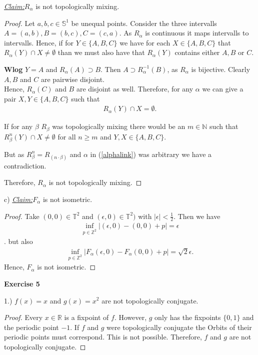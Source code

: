 \documentclass{article}
\newcommand{\claim}{\underline{\textit{Claim:}}\hspace{0,2cm}}
\newcommand{\N}{\mathbb{N}}
\newcommand{\Z}{\mathbb{Z}}
\renewcommand{\S}[1]{\mathbb{S}^{#1}}
\newcommand{\T}[1]{\mathbb{T}^{#1}}
\newcommand{\R}{\mathbb{R}}
\theoremstyle{definition}
\theoremstyle{plain}
\theoremstyle{remark}
\newcommand{\aufgabe}[1]{
	{
		\vspace*{0.5cm}
		\textsf{\textbf{Exercise #1}}
		\vspace*{0.2cm}

	}
}
\newcommand{\teilaufgabe}[1]{
	{
\noindent 
\vspace*{0.2cm}
\hspace*{0,1 cm}
\textsf{#1)}
}
}
\begin{document}
\claim $R_{\alpha}$ is not topologically mixing.
\begin{proof}
	Let $a,b,c \in \S1$ be unequal points.
	Consider the three intervalls $A = (a,b), B=(b,c), C=(c,a)$. As $R_{\alpha}$ is continuous it maps intervalls to intervalls. Hence, if for $Y\in\{A,B,C\}$ we have for each $X\in\{A,B,C\}$ that $R_{\alpha}(Y)\cap X\neq \emptyset$ than we must also have that $R_{\alpha}(Y)$ contains either $A, B$ or $C$.

	\textbf{Wlog} $Y=A$ and $R_{\alpha}(A) \supset B$. Then $A\supset R_{\alpha}^{-1}(B)$, as $R_{\alpha}$ is bijective. Clearly $A,B$ and $C$ are pairwise disjoint.\\
	Hence, $R_{\alpha}(C)$ and $B$ are disjoint as well.
	Therefore, for any $\alpha$ we can give a pair $X,Y\in\{A,B,C\}$ such that 
	\begin{align}\label{alphalink}
		R_{\alpha}(Y)\cap X = \emptyset.
	\end{align} 
	
	If for any $\beta$ $R_{\beta}$ was topologically mixing there would be an $m\in \N$ such that $R_{\beta}^{n}(Y) \cap X\neq\emptyset$ for all $n \geq m $ and $Y,X \in \{A,B,C\}$.

	But as $R_{\beta}^n = R_{(n\cdot\beta)}$ and $\alpha$ in (\ref{alphalink}) was arbitrary we have a contradiction.

Therefore, $R_{\alpha}$ is not topologically mixing.
\end{proof}
\teilaufgabe{c} \claim $F_{\alpha}$ is not isometric.
\begin{proof}
	Take $(0,0)\in \T2$ and $(\epsilon,0)\in\T2)$ with $|\epsilon| < \frac{1}{2}$. Then we have 
	\begin{align}
		\inf_{p\in\Z^2}|(\epsilon,0) - (0,0) + p| = \epsilon
	\end{align}.
	but also 
	\begin{align}
		\inf_{p\in\Z^2}|F_{\alpha}(\epsilon,0) - F_{\alpha}(0,0) + p| = \sqrt{2} \epsilon.
	\end{align}
	Hence, $F_{\alpha}$ is not isometric. 
\end{proof}
\aufgabe5
\teilaufgabe{1.} $f(x)=x$ and $g(x)=x^2$ are not topologically conjugate. 
\begin{proof}
	Every $x\in\R$ is a fixpoint of $f$. However, $g$ only has the fixpoints $\{0,1\}$ and the periodic point $-1$. If $f$ and $g$ were topologically conjugate the Orbits of their periodic points must correspond. This is not possible. Therefore, $f$ and $g$ are not topologically conjugate.
\end{proof}
\end{document}
